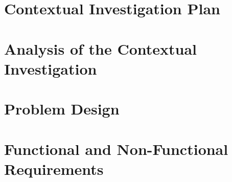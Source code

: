 \documentclass[11pt,oneside]{article}
\begin{document}
	
		
	\vspace*{0.5cm}

	
		
		
		
		\vspace*{-0.5cm}
		\tableofcontents
		\newpage

\clearpage
\justify
\section{Contextual Investigation Plan}


\clearpage
\justify
\section{Analysis of the Contextual Investigation}


\clearpage
\justify
\section{Problem Design}


\clearpage
\justify
\section{Functional and Non-Functional Requirements}


\clearpage

\end{document}
